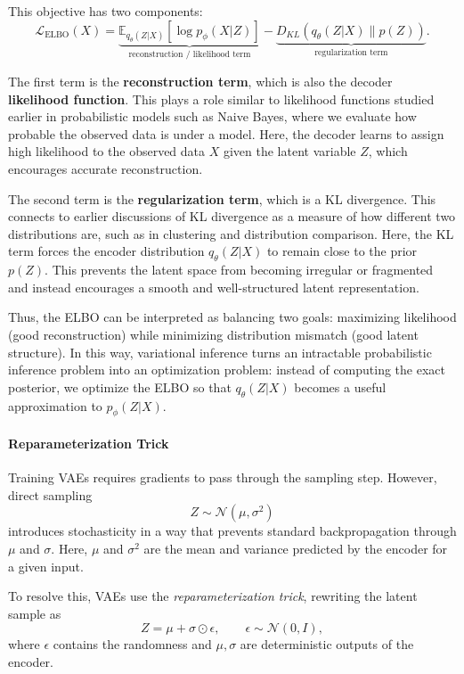\documentclass{article}
\begin{document}
This objective has two components:
\[
\mathcal{L}_{\text{ELBO}}(X)
=
\underbrace{\mathbb{E}_{q_\theta(Z|X)}[\log p_\phi(X|Z)]}_{\text{reconstruction / likelihood term}}
-
\underbrace{D_{KL}\!\left(q_\theta(Z|X)\|p(Z)\right)}_{\text{regularization term}}.
\]

The first term is the \textbf{reconstruction term}, which is also the decoder \textbf{likelihood function}. This plays a role similar to likelihood functions studied earlier in probabilistic models such as Naive Bayes, where we evaluate how probable the observed data is under a model. Here, the decoder learns to assign high likelihood to the observed data \(X\) given the latent variable \(Z\), which encourages accurate reconstruction.

The second term is the \textbf{regularization term}, which is a KL divergence. This connects to earlier discussions of KL divergence as a measure of how different two distributions are, such as in clustering and distribution comparison. Here, the KL term forces the encoder distribution \(q_\theta(Z|X)\) to remain close to the prior \(p(Z)\). This prevents the latent space from becoming irregular or fragmented and instead encourages a smooth and well-structured latent representation.

Thus, the ELBO can be interpreted as balancing two goals: maximizing likelihood (good reconstruction) while minimizing distribution mismatch (good latent structure). In this way, variational inference turns an intractable probabilistic inference problem into an optimization problem: instead of computing the exact posterior, we optimize the ELBO so that \(q_\theta(Z|X)\) becomes a useful approximation to \(p_\phi(Z|X)\).

\paragraph{Reparameterization Trick}

Training VAEs requires gradients to pass through the sampling step. However, direct sampling
\[
Z \sim \mathcal{N}(\mu,\sigma^2)
\]
introduces stochasticity in a way that prevents standard backpropagation through \(\mu\) and \(\sigma\). Here, \(\mu\) and \(\sigma^2\) are the mean and variance predicted by the encoder for a given input.

To resolve this, VAEs use the \emph{reparameterization trick}, rewriting the latent sample as
\[
Z = \mu + \sigma \odot \epsilon,
\qquad
\epsilon \sim \mathcal{N}(0,I),
\]
where \(\epsilon\) contains the randomness and \(\mu,\sigma\) are deterministic outputs of the encoder.
\end{document}
